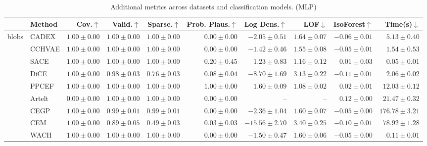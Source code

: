 \begin{table}[ht]
\centering
\caption{Additional metrics across datasets and classification models. (MLP)}
\label{tab:other_metrics_mlpclassifier}
\begin{center}
\begin{sc}
\begin{scriptsize}
\begin{tabular}{l|l|rrrrrrrr}
\toprule
 & Method & Cov.$\uparrow$ & Valid.$\uparrow$ & Sparse.$\uparrow$ & Prob. Plaus.$\uparrow$ & Log Dens.$\uparrow$ & LOF$\downarrow$ & IsoForest$\uparrow$ & Time(s)$\downarrow$ \\
\midrule
\multirow{9}{*}{blobs} & CADEX & $\boldsymbol{1.00\pm{0.00}}$ & $\boldsymbol{1.00\pm{0.00}}$ & $\boldsymbol{1.00\pm{0.00}}$ & $0.00\pm{0.00}$ & $-2.05\pm{0.51}$ & $1.64\pm{0.07}$ & $-0.06\pm{0.01}$ & $5.13\pm{0.40}$ \\
 & CCHVAE & $\boldsymbol{1.00\pm{0.00}}$ & $\boldsymbol{1.00\pm{0.00}}$ & $\boldsymbol{1.00\pm{0.00}}$ & $0.00\pm{0.00}$ & $-1.42\pm{0.46}$ & $1.55\pm{0.08}$ & $-0.05\pm{0.01}$ & $1.54\pm{0.53}$ \\
 & SACE & $\boldsymbol{1.00\pm{0.00}}$ & $\boldsymbol{1.00\pm{0.00}}$ & $\boldsymbol{1.00\pm{0.00}}$ & $0.20\pm{0.45}$ & $1.23\pm{0.83}$ & $1.16\pm{0.12}$ & $0.01\pm{0.03}$ & $\boldsymbol{0.05\pm{0.01}}$ \\
 & DiCE & $\boldsymbol{1.00\pm{0.00}}$ & $0.98\pm{0.03}$ & $0.76\pm{0.03}$ & $0.08\pm{0.04}$ & $-8.70\pm{1.69}$ & $3.13\pm{0.22}$ & $-0.11\pm{0.01}$ & $2.06\pm{0.02}$ \\
 & PPCEF & $\boldsymbol{1.00\pm{0.00}}$ & $\boldsymbol{1.00\pm{0.00}}$ & $\boldsymbol{1.00\pm{0.00}}$ & $\boldsymbol{1.00\pm{0.00}}$ & $\boldsymbol{1.60\pm{0.09}}$ & $\boldsymbol{1.08\pm{0.02}}$ & $0.02\pm{0.01}$ & $12.03\pm{0.12}$ \\
 & Artelt & $0.00\pm{0.00}$ & $\boldsymbol{1.00\pm{0.00}}$ & $\boldsymbol{1.00\pm{0.00}}$ & $0.00\pm{0.00}$ & -- & -- & $\boldsymbol{0.12\pm{0.00}}$ & $21.47\pm{0.32}$ \\
 & CEGP & $\boldsymbol{1.00\pm{0.00}}$ & $0.99\pm{0.01}$ & $0.99\pm{0.01}$ & $0.00\pm{0.00}$ & $-2.36\pm{1.04}$ & $1.60\pm{0.07}$ & $-0.05\pm{0.00}$ & $176.78\pm{3.21}$ \\
 & CEM & $\boldsymbol{1.00\pm{0.00}}$ & $0.89\pm{0.05}$ & $0.49\pm{0.03}$ & $0.03\pm{0.03}$ & $-15.56\pm{2.70}$ & $3.40\pm{0.25}$ & $-0.10\pm{0.01}$ & $78.92\pm{1.28}$ \\
 & WACH & $\boldsymbol{1.00\pm{0.00}}$ & $\boldsymbol{1.00\pm{0.00}}$ & $\boldsymbol{1.00\pm{0.00}}$ & $0.00\pm{0.00}$ & $-1.50\pm{0.47}$ & $1.60\pm{0.06}$ & $-0.05\pm{0.00}$ & $0.11\pm{0.01}$ \\

\end{tabular}
\end{scriptsize}
\end{sc}
\end{center}
\end{table}
